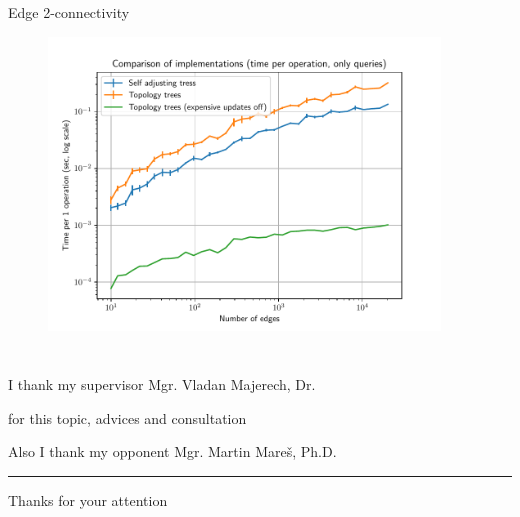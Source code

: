 \documentclass{beamer}				%
\begin{document}
\begin{frame}{Edge 2-connectivity}
	\vskip -3mm
	\begin{figure}
	\centering
	\includegraphics[width=10.4cm]{../charts/double_edge_connectivity_op_queries.pdf}
	\end{figure}
\end{frame}


\section*{}
\begin{frame}{}

\centerline{I thank my supervisor Mgr. Vladan Majerech, Dr.}
\centerline{for this topic, advices and consultation}

\bigskip\bigskip

\centerline{Also I thank my opponent Mgr. Martin Mareš, Ph.D.}

\pause
\bigskip\hrule
\vfill
{\Large\centerline{Thanks for your attention}}
\vfill
\end{frame}
\end{document}
